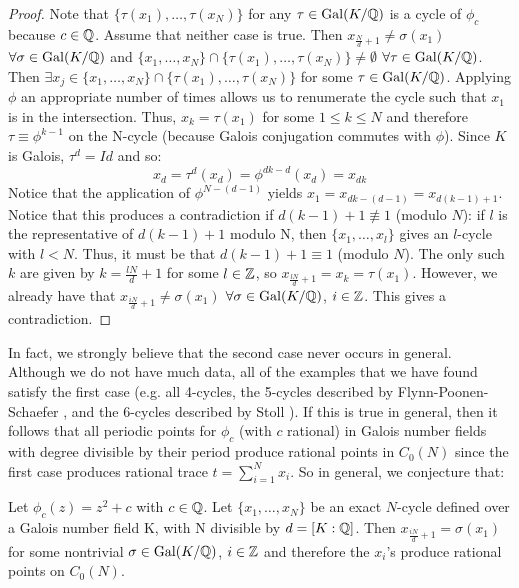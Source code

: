 \begin{proof}
	Note that $\{\tau(x_1), \ldots, \tau(x_{N})\}$ for any $\tau \in
	\mathrm{Gal}(K/\mathbb{Q})$ is a cycle of $\phi_c$ because $c \in \mathbb{Q}$. Assume
	that neither case is true. Then $x_{\frac{N}{d}+1} \neq \sigma(
	x_1)$ $\forall \sigma \in \mathrm{Gal}(K/\mathbb{Q})$ and $\{x_1, \ldots, x_{N}\}
	\cap \{\tau(x_1), \ldots, \tau(x_{N})\} \neq \emptyset$ $\forall
	\tau \in \mathrm{Gal}(K/\mathbb{Q})$. Then $\exists x_j \in \{x_1, \ldots, x_{N}\}
	\cap \{\tau(x_1), \ldots, \tau(x_{N})\}$ for some $\tau \in \mathrm{Gal}(K/
	\mathbb{Q})$. Applying $\phi$ an appropriate number of times allows us to
	renumerate the cycle	such that $x_1$ is in the intersection.
	Thus, $x_k = \tau(x_1)$ for some $1 \leq k \leq N$ and therefore $
	\tau \equiv \phi^{k-1}$ on the N-cycle (because Galois conjugation
	commutes with $\phi$). Since $K$ is Galois, $\tau^d = Id$ and so:
	\[
		x_d = \tau^d(x_d) = \phi^{dk-d}(x_d) = x_{dk}
	\]
	Notice that the application of $\phi^{N-(d-1)}$ yields $x_1 =
	x_{dk-(d-1)} = x_{d(k-1) + 1}$. Notice that this produces a
	contradiction if $d(k-1) + 1 \not\equiv 1$ (modulo $N$): if $l$
	is the representative of $d(k-1) + 1$ modulo N, then $\{x_1, \ldots
	, x_l\}$ gives an $l$-cycle with $l < N$. Thus, it must be that
	$d(k-1) + 1 \equiv 1$ (modulo $N$). The only such $k$ are given
	by $k = \frac{lN}{d} + 1$ for some $l \in \mathbb{Z}$, so $x_{\frac{lN}{d}
	+ 1} = x_k = \tau(x_1)$.	However, we already have that
	$x_{\frac{iN}{d}+1} \neq \sigma(x_1)$ $\forall \sigma \in \mathrm{Gal}(K/\mathbb{Q})$,
	$i \in \mathbb{Z}$. This gives a contradiction.
\end{proof}

In fact, we strongly believe that the second case never occurs in general.
Although we do not have much data, all of the examples that we have found
satisfy the first case (e.g. all 4-cycles, the 5-cycles described by
Flynn-Poonen-Schaefer \cite{MR1480542}, and the 6-cycles described by
Stoll \cite{MR2465796}). If this is true in general, then it follows that
all periodic points for $\phi_c$ (with $c$ rational) in Galois number fields
with degree divisible by their period produce rational points in $C_0(N)$
since the first case produces rational trace $t = \sum\limits_{i=1}^N x_i$.
So in general, we conjecture that:

\begin{conjecture}
	Let $\phi_c(z) = z^2 + c$ with $c \in \mathbb{Q}$. Let $\{x_1, \ldots, x_{N}\}$ be
	an exact $N$-cycle defined over a Galois number field K, with N
	divisible by	$d = [K:\mathbb{Q} ]$. Then $x_{\frac{iN}{d}+1} = \sigma(x_1)$
	for some nontrivial $\sigma \in \mathrm{Gal}(K/\mathbb{Q})$, $i \in \mathbb{Z}$ and therefore the
	$x_i$'s produce rational points on $C_0(N)$.
\end{conjecture}

